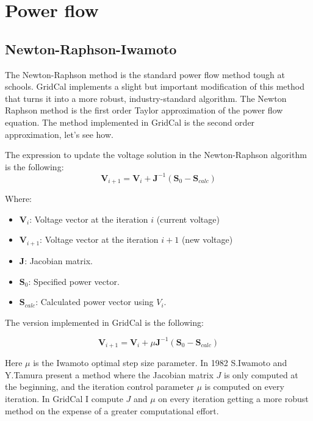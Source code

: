 \documentclass[11pt,fleqn]{book} %
\begin{document}
\chapter{Power flow}

\section{Newton-Raphson-Iwamoto}

The Newton-Raphson method is the standard power flow method tough at schools. GridCal implements a slight but important modification of this method that turns it into a more robust, industry-standard algorithm. The Newton Raphson method is the first order Taylor approximation of the power flow equation. The method implemented in GridCal is the second order approximation, let's see how.

The expression to update the voltage solution in the Newton-Raphson algorithm is the following:
\begin{equation}
\textbf{V}_{i+1} = \textbf{V}_i + \textbf{J}^{-1}(\textbf{S}_0 - \textbf{S}_{calc})
\end{equation}

Where:
\begin{itemize}
	\item $\textbf{V}_i$: Voltage vector at the iteration $i$  (current voltage) 
	\item $\textbf{V}_{i+1}$: Voltage vector at the iteration $i+1$  (new voltage)
	\item $\textbf{J}$: Jacobian matrix.
	\item $\textbf{S}_0$: Specified power vector.
	\item $\textbf{S}_{calc}$: Calculated power vector using $V_i$.
\end{itemize}

The version implemented in GridCal is the following:

\begin{equation}
\textbf{V}_{i+1} = \textbf{V}_i + \mu \textbf{J}^{-1}(\textbf{S}_0 - \textbf{S}_{calc})
\end{equation}

Here $\mu$ is the Iwamoto optimal step size parameter. In 1982 S.Iwamoto and Y.Tamura present a method \cite{iwamoto1981load} where the Jacobian matrix $J$ is only computed at the beginning, and the iteration control parameter $\mu$ is computed on every iteration. In GridCal I compute $J$ and $\mu$ on every iteration getting a more robust method on the expense of a greater computational effort.
\end{document}

